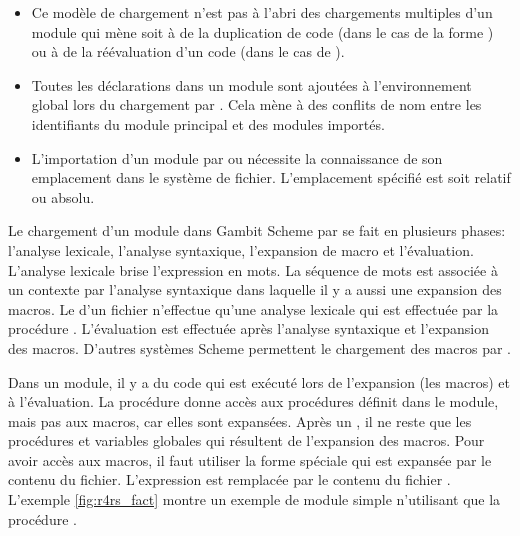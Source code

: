 \begin{itemize}
  \item Ce modèle de chargement n'est pas à l'abri des chargements multiples
    d'un module qui mène soit à de la duplication de code (dans le cas de la forme )
    ou à de la réévaluation d'un code (dans le cas de ).

  \item Toutes les déclarations dans un module sont ajoutées à l'environnement
    global lors du chargement par . Cela mène à des conflits de
    nom entre les identifiants du module principal et des modules importés.

  \item L'importation d'un module par  ou  nécessite la connaissance
    de son emplacement dans le système de fichier. L'emplacement spécifié est soit relatif ou
    absolu.

\end{itemize}


Le chargement d'un module dans Gambit Scheme par  se fait en plusieurs
phases: l'analyse lexicale, l'analyse syntaxique, l'expansion de macro et
l'évaluation. L'analyse lexicale brise l'expression en mots. La séquence de
mots est associée à un contexte par l'analyse syntaxique dans laquelle il y a aussi
une expansion des macros. Le  d'un fichier n'effectue qu'une
analyse lexicale qui est effectuée par la procédure . L'évaluation
est effectuée après l'analyse syntaxique et l'expansion des macros. D'autres systèmes
Scheme permettent le chargement des macros par .

Dans un module, il y a du code qui est exécuté lors de l'expansion (les macros)
et à l'évaluation. La procédure  donne accès aux procédures définit
dans le module, mais pas aux macros, car elles sont expansées.  Après un
, il ne reste que les procédures et variables globales qui
résultent de l'expansion des macros.  Pour avoir accès aux macros, il faut
utiliser la forme spéciale  qui est expansée par le contenu du
fichier.  L'expression  est remplacée par le
contenu du fichier . L'exemple \ref{fig:r4rs_fact} montre un
exemple de module simple n'utilisant que la procédure .

